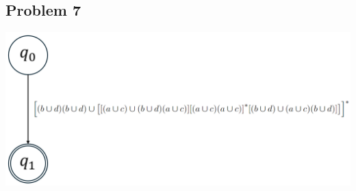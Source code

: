 \documentclass{article}
\begin{document}
\subsection*{Problem 7}

\begin{center}
    \includegraphics[scale=0.24]{exam1-4.png}
\end{center}
\end{document}
